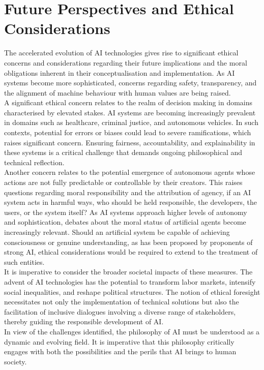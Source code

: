 \documentclass[runningheads]{llncs}
\begin{document}
\section{Future Perspectives and Ethical Considerations}
%
The accelerated evolution of AI technologies gives rise to significant ethical concerns and considerations regarding their future implications and the moral obligations inherent in their conceptualisation and implementation. As AI systems become more sophisticated, concerns regarding safety, transparency, and the alignment of machine behaviour with human values are being raised.
\\
A significant ethical concern relates to the realm of decision making in domains characterised by elevated stakes. AI systems are becoming increasingly prevalent in domains such as healthcare, criminal justice, and autonomous vehicles. In such contexts, potential for errors or biases could lead to severe ramifications, which raises significant concern. Ensuring fairness, accountability, and explainability in these systems is a critical challenge that demands ongoing philosophical and technical reflection.
\\
Another concern relates to the potential emergence of autonomous agents whose actions are not fully predictable or controllable by their creators. This raises questions regarding moral responsibility and the attribution of agency, if an AI system acts in harmful ways, who should be held responsible, the developers, the users, or the system itself?
As AI systems approach higher levels of autonomy and sophistication, debates about the moral status of artificial agents become increasingly relevant. Should an artificial system be capable of achieving consciousness or genuine understanding, as has been proposed by proponents of strong AI, ethical considerations would be required to extend to the treatment of such entities.
\\
It is imperative to consider the broader societal impacts of these measures. The advent of AI technologies has the potential to transform labor markets, intensify social inequalities, and reshape political structures. The notion of ethical foresight necessitates not only the implementation of technical solutions but also the facilitation of inclusive dialogues involving a diverse range of stakeholders, thereby guiding the responsible development of AI.
\\
In view of the challenges identified, the philosophy of AI must be understood as a dynamic and evolving field. It is imperative that this philosophy critically engages with both the possibilities and the perils that AI brings to human society.
%
%
%
%
%
\end{document}
